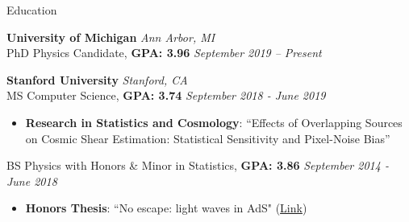 \documentclass{resume} %
\begin{document}
\begin{rSection}{Education}

{\bf University of Michigan} \hfill {\em Ann Arbor, MI} 
\\ PhD Physics Candidate, \textbf{GPA: 3.96} \hfill {\em September 2019 -- Present}
\vspace*{-0.1cm}
%

{\bf Stanford University} \hfill {\em Stanford, CA} 
\\ MS Computer Science, \textbf{GPA: 3.74} \hfill {\em September 2018 - June 2019}

\vspace*{-0.1cm}
%
\begin{itemize}[itemsep=-0.3em] %

    \item 
    \textbf{Research in Statistics and Cosmology}: ``Effects of Overlapping Sources on Cosmic Shear Estimation:  Statistical Sensitivity and Pixel-Noise Bias''
\end{itemize}

%
BS Physics with Honors \& Minor in Statistics, \textbf{GPA: 3.86} \hfill {\em September 2014 - June 2018}
%
\vspace*{-0.1cm}
\begin{itemize}[itemsep=-0.25em] 

    \item 
    \textbf{Honors Thesis}: ``No escape: light waves in AdS" (\href{https://purl.stanford.edu/vf208qp2190}{Link})

\end{itemize}
%
\vspace*{-0.1cm}
\end{rSection}

\end{document}
